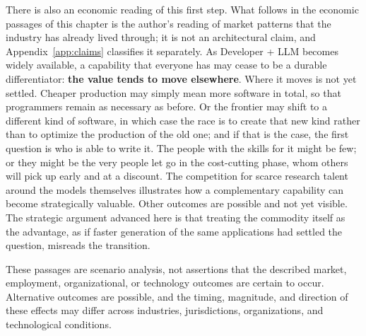 \documentclass[10pt,oneside,openany]{book}
\begin{document}
There is also an economic reading of this first step. What follows in the economic passages of this chapter is the author's reading of market patterns that the industry has already lived through; it is not an architectural claim, and Appendix~\ref{app:claims} classifies it separately. As Developer + LLM becomes widely available, a capability that everyone has may cease to be a durable differentiator: \textbf{the value tends to move elsewhere}. Where it moves is not yet settled. Cheaper production may simply mean more software in total, so that programmers remain as necessary as before. Or the frontier may shift to a different kind of software, in which case the race is to create that new kind rather than to optimize the production of the old one; and if that is the case, the first question is who is able to write it. The people with the skills for it might be few; or they might be the very people let go in the cost-cutting phase, whom others will pick up early and at a discount. The competition for scarce research talent around the models themselves illustrates how a complementary capability can become strategically valuable. Other outcomes are possible and not yet visible. The strategic argument advanced here is that treating the commodity itself as the advantage, as if faster generation of the same applications had settled the question, misreads the transition.

These passages are scenario analysis, not assertions that the described market, employment, organizational, or technology outcomes are certain to occur. Alternative outcomes are possible, and the timing, magnitude, and direction of these effects may differ across industries, jurisdictions, organizations, and technological conditions.
\end{document}
